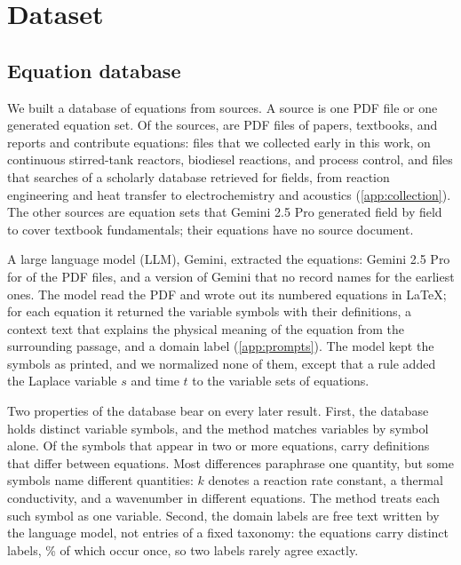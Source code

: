 \section{Dataset}\label{sec:dataset}

\subsection{Equation database}\label{sec:db}

We built a database of \NEq{} equations from \NSources{} sources. A source is one PDF file or one
generated equation set. Of the sources, \NPdf{} are PDF files of papers, textbooks, and reports and
contribute \NEqPdf{} equations: \NEarly{} files that we collected early in this work, on continuous
stirred-tank reactors, biodiesel reactions, and process control, and \NOpenAlex{} files that
searches of a scholarly database retrieved for \NFields{} fields, from reaction engineering and heat
transfer to electrochemistry and acoustics (\ref{app:collection}). The other \NRefSets{} sources are
equation sets that Gemini 2.5 Pro \citep{Gemini25} generated field by field to cover textbook
fundamentals; their \NEqRef{} equations have no source document.

A large language model (LLM), Gemini, extracted the equations: Gemini 2.5 Pro for \NExtractPro{} of
the PDF files, and a version of Gemini that no record names for the \NExtractEarliest{} earliest
ones. The model read the PDF and wrote out its numbered equations in \LaTeX{}; for each equation it
returned the variable symbols with their definitions, a context text that explains the physical
meaning of the equation from the surrounding passage, and a domain label (\ref{app:prompts}). The
model kept the symbols as printed, and we normalized none of them, except that a rule added the
Laplace variable $s$ and time $t$ to the variable sets of \NRuleAdded{} equations.

Two properties of the database bear on every later result. First, the database holds \NSymbols{}
distinct variable symbols, and the method matches variables by symbol alone. Of the
\NSymbolsShared{} symbols that appear in two or more equations, \NSymbolsConflict{} carry
definitions that differ between equations. Most differences paraphrase one quantity, but some
symbols name different quantities: $k$ denotes a reaction rate constant, a thermal conductivity,
and a wavenumber in different equations. The method treats each such symbol as one variable.
Second, the domain labels are free text written by the language model, not entries of a fixed
taxonomy: the equations carry \NLabels{} distinct labels, \ShareLabelsOnce\% of which occur once,
so two labels rarely agree exactly.

